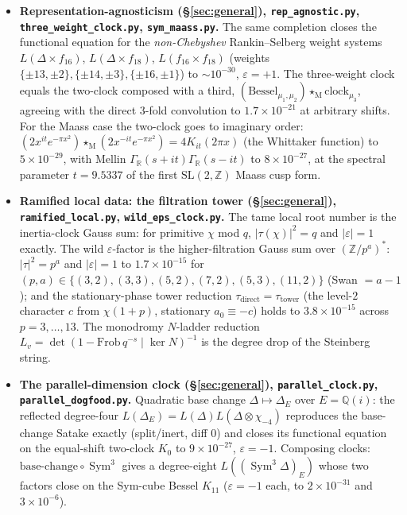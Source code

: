 \documentclass[11pt]{article}
\theoremstyle{definition}
\newcommand{\Sym}{\operatorname{Sym}}
\begin{document}
\begin{itemize}
\item \textbf{Representation-agnosticism (\S\ref{sec:general}), \texttt{rep\_agnostic.py},
\texttt{three\_weight\_clock.py}, \texttt{sym\_maass.py}.} The same completion closes the functional
equation for the \emph{non-Chebyshev} Rankin--Selberg weight systems $L(\Delta\times f_{16})$,
$L(\Delta\times f_{18})$, $L(f_{16}\times f_{18})$ (weights $\{\pm13,\pm2\},\{\pm14,\pm3\},\{\pm16,\pm1\}$)
to $\sim10^{-30}$, $\varepsilon=+1$. The three-weight clock equals the two-clock composed with a third,
$(\text{Bessel}_{\mu_1,\mu_2})\star_{\mathrm M}\text{clock}_{\mu_3}$, agreeing with the direct $3$-fold
convolution to $1.7\times10^{-21}$ at arbitrary shifts. For the Maass case the two-clock goes to
imaginary order: $(2x^{it}e^{-\pi x^2})\star_{\mathrm M}(2x^{-it}e^{-\pi x^2})=4K_{it}(2\pi x)$ (the
Whittaker function) to $5\times10^{-29}$, with Mellin $\Gamma_{\mathbb R}(s+it)\Gamma_{\mathbb R}(s-it)$
to $8\times10^{-27}$, at the spectral parameter $t=9.5337$ of the first $\mathrm{SL}(2,\mathbb Z)$ Maass
cusp form.

\item \textbf{Ramified local data: the filtration tower (\S\ref{sec:general}), \texttt{ramified\_local.py},
\texttt{wild\_eps\_clock.py}.} The tame local root number is the inertia-clock Gauss sum: for primitive
$\chi$ mod $q$, $|\tau(\chi)|^2=q$ and $|\varepsilon|=1$ exactly. The wild $\varepsilon$-factor is the
higher-filtration Gauss sum over $(\mathbb Z/p^a)^*$: $|\tau|^2=p^a$ and $|\varepsilon|=1$ to
$1.7\times10^{-15}$ for $(p,a)\in\{(3,2),(3,3),(5,2),(7,2),(5,3),(11,2)\}$ (Swan $=a-1$); and the
stationary-phase tower reduction $\tau_{\mathrm{direct}}=\tau_{\mathrm{tower}}$ (the level-$2$ character
$c$ from $\chi(1+p)$, stationary $a_0\equiv-c$) holds to $3.8\times10^{-15}$ across $p=3,\dots,13$. The
monodromy $N$-ladder reduction $L_v=\det(1-\mathrm{Frob}\,q^{-s}\mid\ker N)^{-1}$ is the degree drop of
the Steinberg string.

\item \textbf{The parallel-dimension clock (\S\ref{sec:general}), \texttt{parallel\_clock.py},
\texttt{parallel\_dogfood.py}.} Quadratic base change $\Delta\mapsto\Delta_E$ over $E=\mathbb Q(i)$: the
reflected degree-four $L(\Delta_E)=L(\Delta)L(\Delta\otimes\chi_{-4})$ reproduces the base-change Satake
exactly (split/inert, diff $0$) and closes its functional equation on the equal-shift two-clock $K_0$ to
$9\times10^{-27}$, $\varepsilon=-1$. Composing clocks: $\mathrm{base\text{-}change}\circ\Sym^3$ gives a
degree-eight $L((\Sym^3\Delta)_E)$ whose two factors close on the Sym-cube Bessel $K_{11}$ ($\varepsilon=-1$
each, to $2\times10^{-31}$ and $3\times10^{-6}$).


\end{itemize}
\end{document}
